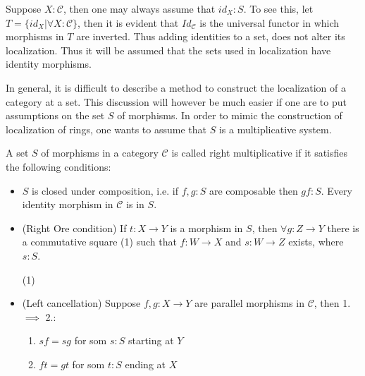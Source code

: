     \begin{remark}
        Suppose $X:\mathcal{C}$, then one may always assume that $id_{X}:S$. To see this, let $T = \{id_{X} |\forall X:\mathcal{C} \}$, then it is evident that $Id_{\mathcal{C}}$ is the universal functor in which morphisms in $T$ are inverted. Thus adding identities to a set, does not alter its localization. Thus it will be assumed that the sets used in localization have identity morphisms.
    \end{remark}

    In general, it is difficult to describe a method to construct the localization of a category at a set. This discussion will however be much easier if one are to put assumptions on the set $S$ of morphisms. In order to mimic the construction of localization of rings, one wants to assume that $S$ is a multiplicative system.

    \begin{definition}
        A set $S$ of morphisms in a category $\mathcal{C}$ is called right multiplicative if it satisfies the following conditions:
        \begin{itemize}
            \item $S$ is closed under composition, i.e. if $f,g : S$ are composable then $gf : S$. Every identity morphism in $\mathcal{C}$ is in $S$.
            \item (Right Ore condition) If $t : X \rightarrow Y$ is a morphism in $S$, then $\forall g:Z\rightarrow Y$ there is a commutative square (1) such that $f:W\rightarrow X$ and $s:W\rightarrow Z$ exists, where $s:S$.
            \begin{center}
                (1)
            \end{center}
            \item (Left cancellation) Suppose $f,g:X\rightarrow Y$ are parallel morphisms in $\mathcal{C}$, then 1. $\implies$ 2.:
            \begin{enumerate}
                \item $sf = sg$ for som $s:S$ starting at $Y$
                \item $ft = gt$ for som $t:S$ ending at $X$
            \end{enumerate}
        \end{itemize}
    \end{definition}

